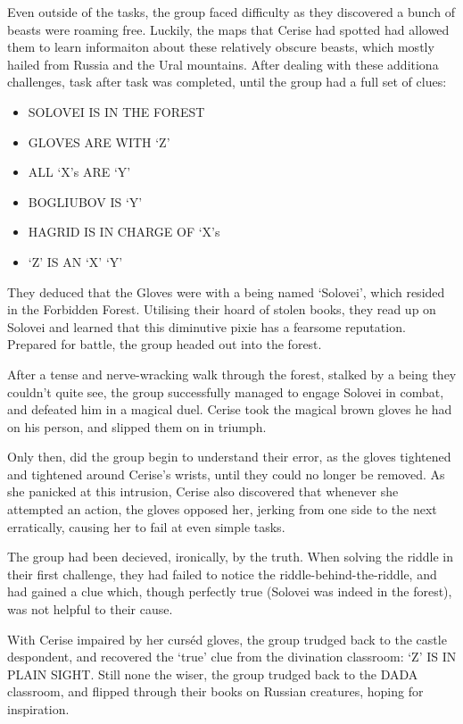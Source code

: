 \documentclass[oneside]{book}
\begin{document}
Even outside of the tasks, the group faced difficulty as they discovered a bunch of beasts were roaming free. Luckily, the maps that Cerise had spotted had allowed them to learn informaiton about these relatively obscure beasts, which mostly hailed from Russia and the Ural mountains. After dealing with these additiona challenges, task after task was completed, until the group had a full set of clues:

\begin{itemize}
	\item SOLOVEI IS IN THE FOREST
	\item GLOVES ARE WITH `Z'
	\item ALL `X's ARE `Y'
	\item BOGLIUBOV IS `Y'
	\item HAGRID IS IN CHARGE OF `X's
	\item `Z' IS AN `X' `Y'
\end{itemize}

They deduced that the Gloves were with a being named `Solovei', which resided in the Forbidden Forest. Utilising their hoard of stolen books, they read up on Solovei and learned that this diminutive pixie has a fearsome reputation. Prepared for battle, the group headed out into the forest. 

After a tense and nerve-wracking walk through the forest, stalked by a being they couldn't quite see, the group successfully managed to engage Solovei in combat, and defeated him in a magical duel. Cerise took the magical brown gloves he had on his person, and slipped them on in triumph. 

Only then, did the group begin to understand their error, as the gloves tightened and tightened around Cerise's wrists, until they could no longer be removed. As she panicked at this intrusion, Cerise also discovered that whenever she attempted an action, the gloves opposed her, jerking from one side to the next erratically, causing her to fail at even simple tasks. 

The group had been decieved, ironically, by the truth. When solving the riddle in their first challenge, they had failed to notice the riddle-behind-the-riddle, and had gained a clue which, though perfectly true (Solovei was indeed in the forest), was not helpful to their cause. 

With Cerise impaired by her curs\'ed gloves, the group trudged back to the castle despondent, and recovered the `true' clue from the divination classroom: `Z' IS IN PLAIN SIGHT. Still none the wiser, the group trudged back to the DADA classroom, and flipped through their books on Russian creatures, hoping for inspiration. 
\end{document}

